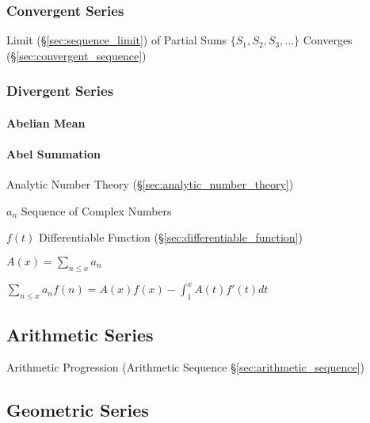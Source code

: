 \subsubsection{Convergent Series}\label{sec:convergent_series}

Limit (\S\ref{sec:sequence_limit}) of Partial Sums $\{ S_1, S_2, S_3,
\ldots \}$ Converges (\S\ref{sec:convergent_sequence})



\subsubsection{Divergent Series}\label{sec:divergent_series}

\paragraph{Abelian Mean}\label{sec:abelian_mean}\hfill

\paragraph{Abel Summation}\label{sec:abel_summation}\hfill

Analytic Number Theory (\S\ref{sec:analytic_number_theory})

$a_n$ Sequence of Complex Numbers

$f(t)$ Differentiable Function (\S\ref{sec:differentiable_function})

$A(x) = \sum_{n \leq x} a_n$

$\sum_{n \leq x} a_n f(n) = A(x)f(x) - \int_1^x A(t)f'(t) dt$



\subsection{Arithmetic Series}\label{sec:arithmetic_series}

Arithmetic Progression (Arithmetic Sequence
\S\ref{sec:arithmetic_sequence})



\subsection{Geometric Series}\label{sec:geometric_series}

